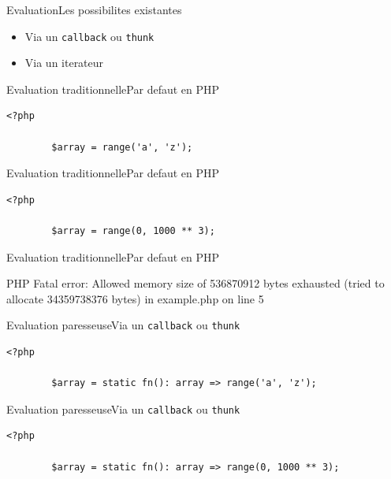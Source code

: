 \begin{frame}{Evaluation}{Les possibilites existantes}
    \begin{itemize}[<+->]
        \item Via un \texttt{callback} ou \texttt{thunk}
        \item Via un iterateur
    \end{itemize}
\end{frame}

\begin{frame}[fragile]{Evaluation traditionnelle}{Par defaut en PHP}
    \begin{lstlisting}[firstnumber=1]
        <?php

        $array = range('a', 'z');
    \end{lstlisting}
\end{frame}

\begin{frame}[fragile]{Evaluation traditionnelle}{Par defaut en PHP}
    \begin{lstlisting}[firstnumber=1]
        <?php

        $array = range(0, 1000 ** 3);
    \end{lstlisting}
\end{frame}

\begin{frame}[fragile]{Evaluation traditionnelle}{Par defaut en PHP}
    \begin{spverbatim}
        PHP Fatal error: Allowed memory size of 536870912 bytes exhausted (tried to allocate 34359738376 bytes) in example.php on line 5
    \end{spverbatim}
\end{frame}

\begin{frame}[fragile]{Evaluation paresseuse}{Via un \texttt{callback} ou \texttt{thunk}}
    \begin{lstlisting}[firstnumber=1]
        <?php

        $array = static fn(): array => range('a', 'z');
    \end{lstlisting}
\end{frame}

\begin{frame}[fragile]{Evaluation paresseuse}{Via un \texttt{callback} ou \texttt{thunk}}
    \begin{lstlisting}[firstnumber=1]
        <?php

        $array = static fn(): array => range(0, 1000 ** 3);
    \end{lstlisting}
\end{frame}

